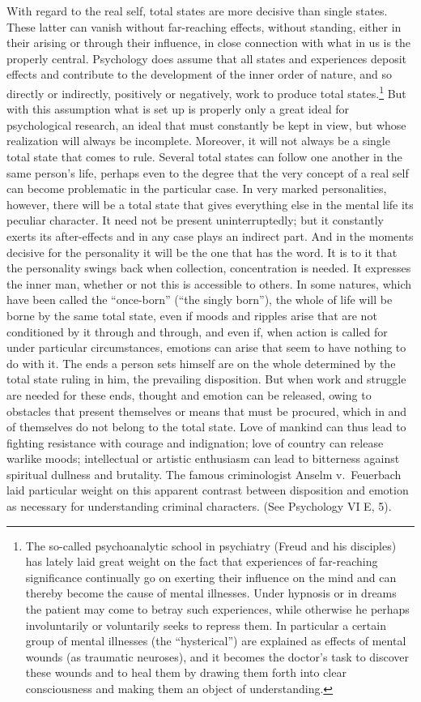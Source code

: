\documentclass[12pt]{book}
\newcommand{\opage}[1]{\marginnote{\footnotesize\textit{[#1]}}}
\begin{document}
With regard to the real self, total states are more decisive than single
states. These latter can vanish without far-reaching effects, without standing,
either in their arising or through their influence, in close connection with what
in us is the properly central. Psychology does assume that all states and
experiences deposit effects and contribute to the development of the inner order
of nature, and so directly or indirectly, positively or \opage{13}negatively,
work to produce total states.\footnote{The so-called psychoanalytic school in
psychiatry (Freud and his disciples) has lately laid great weight on the fact
that experiences of far-reaching significance continually go on exerting their
influence on the mind and can thereby become the cause of mental illnesses. Under
hypnosis or in dreams the patient may come to betray such experiences, while
otherwise he perhaps involuntarily or voluntarily seeks to repress them. In
particular a certain group of mental illnesses (the ``hysterical'') are explained
as effects of mental wounds (as traumatic neuroses), and it becomes the doctor's
task to discover these wounds and to heal them by drawing them forth into clear
consciousness and making them an object of understanding.} But with this
assumption what is set up is properly only a great ideal for psychological
research, an ideal that must constantly be kept in view, but whose realization
will always be incomplete. Moreover, it will not always be a single total state
that comes to rule. Several total states can follow one another in the same
person's life, perhaps even to the degree that the very concept of a real self
can become problematic in the particular case. In very marked personalities,
however, there will be a total state that gives everything else in the mental
life its peculiar character. It need not be present uninterruptedly; but it
constantly exerts its after-effects and in any case plays an indirect part. And
in the moments decisive for the personality it will be the one that has the
word. It is to it that the personality swings back when collection,
concentration is needed. It expresses the inner man, whether or not this is
accessible to others. In some natures, which have been called the ``once-born''
(``the singly born''), the whole of life will be borne by the same total state,
even if moods and ripples arise that are not conditioned by it through and
through, and even if, when action is called for under particular circumstances,
emotions can arise that seem to have nothing to do with it. The ends a person
sets himself are on the whole determined by the total state ruling in him, the
prevailing disposition. But when work and struggle are needed for these ends,
thought and emotion can be released, owing to obstacles that present themselves
or means that must be procured, \opage{14}which in and of themselves do not
belong to the total state. Love of mankind can thus lead to fighting resistance
with courage and indignation; love of country can release warlike moods;
intellectual or artistic enthusiasm can lead to bitterness against spiritual
dullness and brutality. The famous criminologist Anselm v.~Feuerbach laid
particular weight on this apparent contrast between disposition and emotion as
necessary for understanding criminal characters. (See Psychology VI E, 5).
\end{document}
